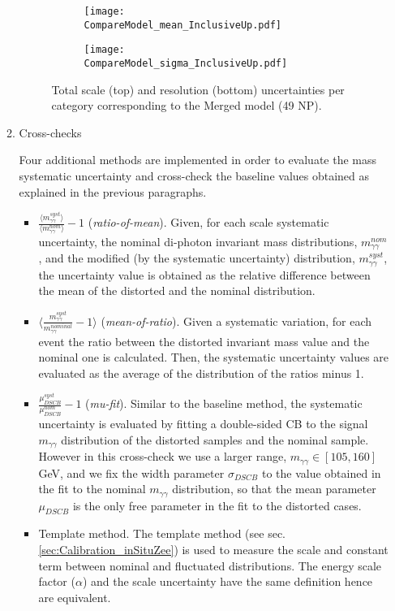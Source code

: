 \begin{enumerate}
\begin{enumerate}
\begin{figure}
\begin{subfigure}[t]{\linewidth}
\begin{center}
\texttt{[image: CompareModel\_mean\_InclusiveUp.pdf]}
\end{center}
\end{subfigure}
\begin{subfigure}[t]{\linewidth}
\begin{center}
\texttt{[image: CompareModel\_sigma\_InclusiveUp.pdf]}
\end{center}
\end{subfigure}
\caption{\label{org0ea9f20}
Total scale (top) and resolution (bottom) uncertainties per category corresponding to the Merged model (49 NP).}
\end{figure}



\item Cross-checks
\label{sec:org44c935f}

Four additional methods are implemented in order to evaluate the mass systematic uncertainty and cross-check the baseline values obtained as explained in the previous paragraphs.


\begin{itemize}
\item \(\frac{\langle m_{\gamma\gamma}^{syst}\rangle}{\langle m_{\gamma\gamma}^{nom}\rangle}-1\) (\textit{ratio-of-mean}). Given, for each scale systematic uncertainty, the nominal di-photon invariant mass distributions, \(m_{\gamma\gamma}^{nom}\), and the modified (by the systematic uncertainty) distribution, \(m_{\gamma\gamma}^{syst}\),  the uncertainty value is obtained as the relative difference between the mean of the distorted and the nominal distribution.
\item \(\langle\frac{m_{\gamma\gamma}^{syst}}{m_{\gamma\gamma}^{nominal}}-1\rangle\) (\textit{mean-of-ratio}). Given a systematic variation, for each event the ratio between the distorted invariant mass value and the nominal one is calculated. Then, the systematic uncertainty values are evaluated as the average of the distribution of the ratios minus 1.
\item \(\frac{ \mu_{DSCB}^{syst}}{\mu_{DSCB}^{nom}}-1\) (\textit{mu-fit}). Similar to the baseline method, the systematic uncertainty is evaluated by fitting a double-sided CB to the signal \(m_{\gamma\gamma}\) distribution of the distorted samples and the nominal sample. However in this cross-check we use a larger range, $m_{\gamma\gamma} \in [105,160]$ GeV, and we fix the width parameter \(\sigma_{DSCB}\) to the value obtained in the fit to the nominal \(m_{\gamma\gamma}\) distribution, so that the mean parameter \(\mu_{DSCB}\) is the only free parameter in the fit to the distorted cases.
\item Template method. The template method (see sec. \ref{sec:Calibration_inSituZee}) is used to measure the scale and constant term between nominal and fluctuated distributions.
The energy scale factor ($\alpha$) and the scale uncertainty have the same definition hence are equivalent.
\end{itemize}



\end{enumerate}
\end{enumerate}
